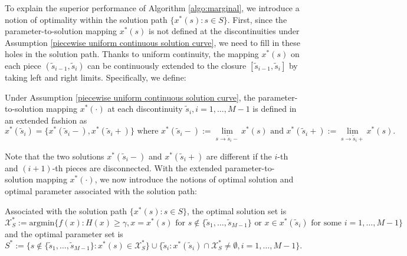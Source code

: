 \documentclass[mnsc,blindrev]{informs4} %
\begin{document}
To explain the superior performance of Algorithm \ref{algo:marginal}, we introduce a notion of optimality within the solution path $\{x^*(s):s\in S\}$. First, since the parameter-to-solution mapping $x^*(s)$ is not defined at the discontinuities under Assumption \ref{piecewise uniform continuous solution curve}, we need to fill in these holes in the solution path. Thanks to uniform continuity, the mapping $x^*(s)$ on each piece $(\tilde s_{i-1},\tilde s_i)$ can be continuously extended to the closure $[\tilde s_{i-1},\tilde s_i]$ by taking left and right limits. Specifically, we define:
\begin{definition}
Under Assumption \ref{piecewise uniform continuous solution curve}, the parameter-to-solution mapping $x^*(\cdot)$ at each discontinuity $\tilde s_i,i=1,\ldots,M-1$ is defined in an extended fashion as
\begin{equation*}
x^*(\tilde s_i)=\{x^*(\tilde s_i-),x^*(\tilde s_i+)\}\text{ where }x^*(\tilde s_i-):=\lim_{s\to\tilde s_i-}x^*(s)\text{ and }x^*(\tilde s_i+):=\lim_{s\to \tilde s_i+}x^*(s).
\end{equation*}
\end{definition}
Note that the two solutions $x^*(\tilde s_i-)$ and $x^*(\tilde s_i+)$ are different if the $i$-th and $(i+1)$-th pieces are disconnected. With the extended parameter-to-solution mapping $x^*(\cdot)$, we now introduce the notions of optimal solution and optimal parameter associated with the solution path:
\begin{definition}
Associated with the solution path $\{x^*(s):s\in S\}$, the optimal solution set is
\begin{equation}\label{optimal solution}
    \mathcal X_S^*:=\text{argmin}\{f(x):H(x)\geq \gamma,x=x^*(s)\text{ for }s\notin\{\tilde s_1,\ldots,\tilde s_{M-1}\}\text{ or }x\in x^*(\tilde s_i)\text{ for some }i=1,\ldots,M-1\}
\end{equation}
and the optimal parameter set is
\begin{equation}\label{optimal parameter}
    S^*:=\{s\notin\{\tilde s_1,\ldots,\tilde s_{M-1}\}:x^*(s)\in \mathcal X_S^*\}\cup\{\tilde s_i:x^*(\tilde s_i) \cap \mathcal X_S^*\neq \emptyset,i=1,\ldots,M-1\}.
\end{equation}
\end{definition}
\end{document}
